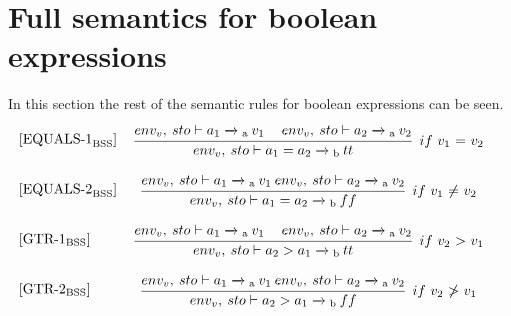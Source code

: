 \section{Full semantics for boolean expressions}\label{AppSec:SemainticsBooleanExpr}
In this section the rest of the semantic rules for boolean expressions can be seen.
\begin{equation}
\begin{minipage}{.2\linewidth}
$[\text{EQUALS-1}_\text{BSS}]$
\end{minipage}
\begin{minipage}{.8\linewidth}
\centering
$\cfrac{env_v, \: sto \vdash a_1 \xrightarrow{}\textsubscript{a} \: v_1 \quad\: env_v, \: sto \vdash a_2 \xrightarrow{}\textsubscript{a} \: v_2}{env_v, \: sto \vdash a_1 = a_2 \xrightarrow{}\textsubscript{b} \: tt}$
$ \: if$ $v_1$ $=$ $v_2$
\end{minipage}
\end{equation}

\begin{equation}
\begin{minipage}{.2\linewidth}
$[\text{EQUALS-2}_\text{BSS}]$
\end{minipage}
\begin{minipage}{.8\linewidth}
\centering
$\cfrac{env_v, \: sto \vdash a_1 \xrightarrow{}\textsubscript{a} \: v_1 \: env_v, \: sto \vdash a_2 \xrightarrow{}\textsubscript{a} \: v_2}{env_v, \: sto \vdash a_1 = a_2 \xrightarrow{}\textsubscript{b} \: ff}$
$ \: if$ $v_1$ $\neq$ $v_2$
\end{minipage}
\end{equation}

\begin{equation}
\begin{minipage}{.2\linewidth}
$[\text{GTR-1}_\text{BSS}]$
\end{minipage}
\begin{minipage}{.8\linewidth}
\centering
$\cfrac{env_v, \: sto \vdash a_1 \xrightarrow{}\textsubscript{a} \: v_1 \quad\: env_v, \: sto \vdash a_2 \xrightarrow{}\textsubscript{a} \: v_2}{env_v, \: sto \vdash a_2 > a_1 \xrightarrow{}\textsubscript{b} \: tt}$
$ \: if$ $v_2$ $>$ $v_1$
\end{minipage}
\end{equation}

\begin{equation}
\begin{minipage}{.2\linewidth}
$[\text{GTR-2}_\text{BSS}]$
\end{minipage}
\begin{minipage}{.8\linewidth}
\centering
$\cfrac{env_v, \: sto \vdash a_1 \xrightarrow{}\textsubscript{a} \: v_1 \: env_v, \: sto \vdash a_2 \xrightarrow{}\textsubscript{a} \: v_2}{env_v, \: sto \vdash a_2 > a_1 \xrightarrow{}\textsubscript{b} \: ff}$
$ \: if$ $v_2$ $\not>$ $v_1$
\end{minipage}
\end{equation}

